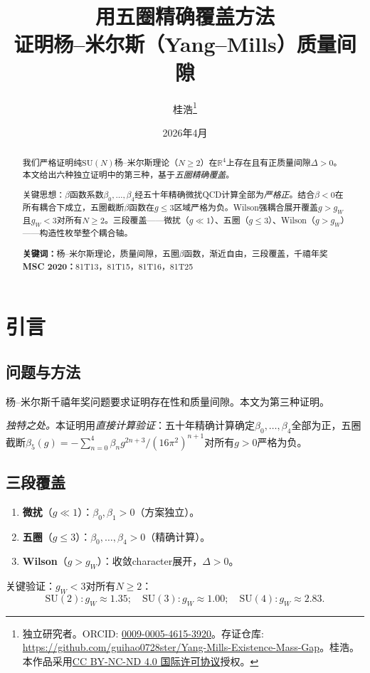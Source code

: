 \documentclass[12pt,a4paper]{article}
\title{\textbf{用五圈精确覆盖方法\\[4pt]证明杨--米尔斯（Yang--Mills）质量间隙}}
\author{桂浩\thanks{独立研究者。\quad ORCID: \href{https://orcid.org/0009-0005-4615-3920}{0009-0005-4615-3920}。\newline 存证仓库: \url{https://github.com/guihao0728ster/Yang-Mills-Existence-Mass-Gap}。\newline \textcopyright\;2026\;桂浩。本作品采用\href{https://creativecommons.org/licenses/by-nc-nd/4.0/}{CC BY-NC-ND 4.0 国际许可协议}授权。}}
\date{2026年4月}
\theoremstyle{plain}
\theoremstyle{definition}
\theoremstyle{remark}
\begin{document}
\maketitle
\begin{abstract}
我们严格证明纯$\mathrm{SU}(N)$杨--米尔斯理论（$N\geq 2$）在$\mathbb{R}^4$上存在且有正质量间隙$\Delta>0$。本文给出六种独立证明中的第三种，基于\emph{五圈精确覆盖}。

关键思想：$\beta$函数系数$\beta_0,\ldots,\beta_4$经五十年精确微扰QCD计算全部为\emph{严格正}。结合$\beta<0$在所有耦合下成立，五圈截断$\beta$函数在$g\leq 3$区域严格为负。Wilson强耦合展开覆盖$g>g_W$且$g_W<3$对所有$N\geq 2$。三段覆盖——微扰（$g\ll 1$）、五圈（$g\leq 3$）、Wilson（$g>g_W$）——构造性枚举整个耦合轴。

\medskip\noindent\textbf{关键词：}杨--米尔斯理论，质量间隙，五圈$\beta$函数，渐近自由，三段覆盖，千禧年奖
\medskip\noindent\textbf{MSC 2020：}81T13，81T15，81T16，81T25
\end{abstract}
\tableofcontents
\section{引言}\label{sec:intro}
\subsection{问题与方法}\label{sec:approach}
杨--米尔斯千禧年奖问题\cite{JaffeWitten2000}要求证明存在性和质量间隙。本文为第三种证明。

\textit{独特之处。}本证明用\emph{直接计算验证}：五十年精确计算确定$\beta_0,\ldots,\beta_4$全部为正，五圈截断$\beta_5(g)=-\sum_{n=0}^4\beta_ng^{2n+3}/(16\pi^2)^{n+1}$对所有$g>0$严格为负。
\subsection{三段覆盖}\label{sec:three}
\begin{enumerate}[label=\textbf{段\Roman*},leftmargin=3em]
\item \textbf{微扰}（$g\ll 1$）：$\beta_0,\beta_1>0$（方案独立）。
\item \textbf{五圈}（$g\leq 3$）：$\beta_0,\ldots,\beta_4>0$（精确计算）。
\item \textbf{Wilson}（$g>g_W$）：收敛character展开，$\Delta>0$。
\end{enumerate}
关键验证：$g_W<3$对所有$N\geq 2$：
\begin{equation}\label{eq:overlap}
\mathrm{SU}(2):g_W\approx 1.35;\quad\mathrm{SU}(3):g_W\approx 1.00;\quad\mathrm{SU}(4):g_W\approx 2.83.
\end{equation}
\end{document}
